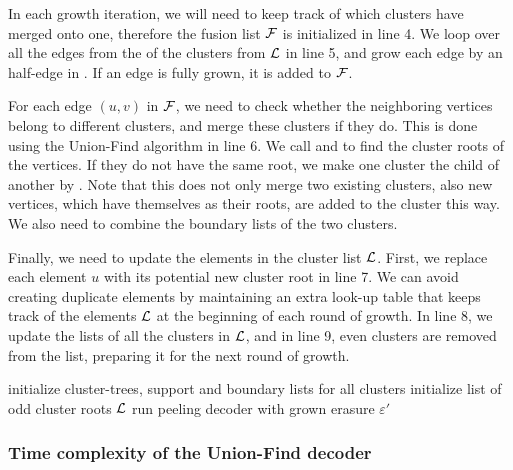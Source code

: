 In each growth iteration, we will need to keep track of which clusters have merged onto one, therefore the fusion list $\mathcal{F}$ is initialized in line 4. We loop over all the edges from the  of the clusters from $\mathcal{L}$ in line 5, and grow each edge by an half-edge in . If an edge is fully grown, it is added to $\mathcal{F}$.

For each edge $(u,v)$ in $\mathcal{F}$, we need to check whether the neighboring vertices belong to different clusters, and merge these clusters if they do. This is done using the Union-Find algorithm in line 6. We call  and  to find the cluster roots of the vertices. If they do not have the same root, we make one cluster the child of another by . Note that this does not only merge two existing clusters, also new vertices, which have themselves as their roots, are added to the cluster this way. We also need to combine the boundary lists of the two clusters.

Finally, we need to update the elements in the cluster list $\mathcal{L}$. First, we replace each element $u$ with its potential new cluster root  in line 7. We can avoid creating duplicate elements by maintaining an extra look-up table that keeps track of the elements $\mathcal{L}$ at the beginning of each round of growth. In line 8, we update the  lists of all the clusters in $\mathcal{L}$, and in line 9, even clusters are removed from the list, preparing it for the next round of growth.

\begin{algo}[algotitle=Union-Find decoder \cite{delfosse2017almost}, label=algo:uf]
  \begin{algorithm}[H]
    \BlankLine
    initialize cluster-trees, support and boundary lists for all clusters \;
    initialize list of odd cluster roots $\mathcal{L}$\;
    run peeling decoder with grown erasure $\varepsilon'$
  \end{algorithm}
\end{algo}

\subsubsection{Time complexity of the Union-Find decoder}
